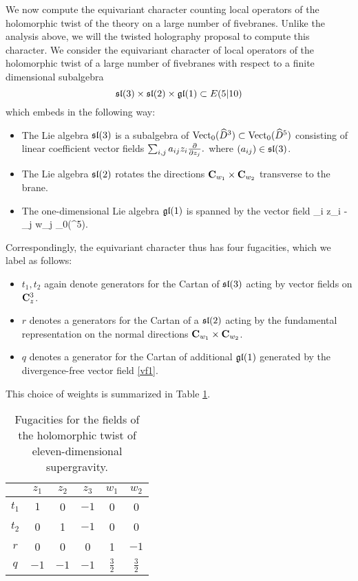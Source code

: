 \documentclass[11pt]{amsart}
\begin{document}
We now compute the equivariant character counting local operators of the holomorphic twist of the theory on a large number of fivebranes. 
Unlike the analysis above, we will the twisted holography proposal to compute this character. We consider the equivariant character of local operators of the holomorphic twist of a large number of fivebranes with respect to a finite dimensional subalgebra
\[
\mathfrak{sl}(3)\times \mathfrak{sl}(2)\times \mathfrak{gl}(1)\subset E(5|10)
\]
which embeds in the following way:
\begin{itemize}
\item The Lie algebra $\mathfrak{sl}(3)$ is a subalgebra of $\operatorname{Vect}_0(\widehat{D}^3) \subset \operatorname{Vect}_0 (\widehat{D}^5)$ consisting of linear coefficient vector fields $\sum_{i,j} a_{ij} z_i \frac{\partial}{\partial z_j}.$
where $(a_{ij}) \in \mathfrak{sl}(3)$. 
\item The Lie algebra $\mathfrak{sl}(2)$ rotates the directions $\mathbf{C}_{w_1} \times \mathbf{C}_{w_2}$ transverse to the brane.
\item The one-dimensional Lie algebra $\mathfrak{gl}(1)$ is spanned by the vector field 
\beqn\label{vf1}
\sum_i z_i  -  \sum_{j} w_j  \in \Vect_0(^5).
\eeqn
\end{itemize}

Correspondingly, the equivariant character thus has four fugacities, which we label as follows:
\begin{itemize}
  \item $t_{1}, t_{2}$ again denote generators for the Cartan of $\mathfrak{sl}(3)$ acting by vector fields on $\mathbf{C}^{3}_{z}$.
  \item $r$ denotes a generators for the Cartan of a $\mathfrak{sl}(2)$ acting by the fundamental representation on the normal directions $\mathbf{C}_{w_1} \times \mathbf{C}_{w_2}$.
  \item $q$ denotes a generator for the Cartan of additional $\mathfrak{gl}(1)$ generated by the divergence-free vector field \eqref{vf1}. 
\end{itemize}

This choice of weights is summarized in Table \ref{tbl:sugra}.

\begin{table}
\begin{center}
\begin{tabular}{c c c c c c}
  & $z_{1}$ & $z_{2}$ & $z_{3}$ & $w_{1}$ & $w_{2}$ \\
  \hline
  $t_{1}$ & $1$ & 0 & $-1$ & 0 & 0 \\
  $t_{2}$ & 0 & 1 & $-1$ & 0 & 0 \\
  $r$ & 0 & 0 & 0 & 1 & $-1$ \\
  $q$ & $-1$ & $-1$ & $-1$ & $\frac{3}{2}$ & $\frac{3}{2}$
\end{tabular}
\caption{Fugacities for the fields of the holomorphic twist of eleven-dimensional supergravity.}
\label{tbl:sugra}
\end{center}
\end{table}
\end{document}
